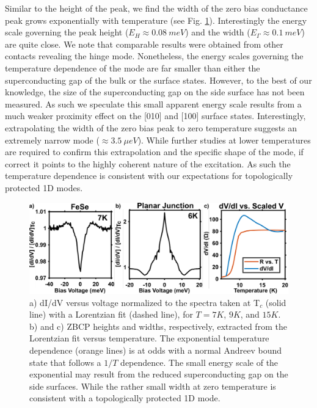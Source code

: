 Similar to the height of the peak, we find the width of the zero bias conductance peak grows exponentially with temperature (see Fig. \ref{DataAnalysis}). Interestingly the energy scale governing the peak height ($E_{H}\approx 0.08~meV$) and the width ($E_{\Gamma}\approx 0.1~meV$) are quite close. We note that comparable results were obtained from other contacts revealing the hinge mode. Nonetheless, the energy scales governing the temperature dependence of the mode are far smaller than either the superconducting gap of the bulk or the surface states.\cite{Zhang2018} However, to the best of our knowledge, the size of the superconducting gap on the side surface has not been measured. As such we speculate this small apparent energy scale results from a much weaker proximity effect on the [010] and [100] surface states. Interestingly, extrapolating the width of the zero bias peak to zero temperature suggests an extremely narrow mode ($\approx 3.5~\mu eV$). While further studies at lower temperatures are required to confirm this extrapolation and the specific shape of the mode, if correct it points to the highly coherent nature of the excitation. As such the temperature dependence is consistent with our expectations for topologically protected 1D modes. 
\par
\begin{figure}
    \centering
    \includegraphics[width=\textwidth]{Chap3/Figures/Figure3.pdf}
    \caption{a) dI/dV versus voltage normalized to the spectra taken at T$_{c}$ (solid line) with a Lorentzian fit (dashed line), for $T=7K$, $9K$, and $15K$. b) and c) ZBCP heights and widths, respectively, extracted from the Lorentzian fit versus temperature. The exponential temperature dependence (orange lines) is at odds with a normal Andreev bound state that follows a $1/T$ dependence. The small energy scale of the exponential may result from the reduced superconducting gap on the side surfaces. While the rather small width at zero temperature is consistent with a topologically protected 1D mode.}
    \label{DataAnalysis}
\end{figure}
